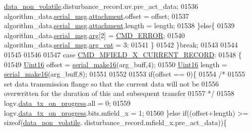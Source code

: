 \begin{DoxyCode}
{{{{{      \hyperlink{a00060_a76ac5f917f5308dcd83de0d7c94559fb}{data\_non\_volatile}.disturbance\_record.uv.pre\_act\_data;
01536                        algorithm\_data.\hyperlink{a00016_afcf5f557aea688aad985eec15269c1da}{serial\_msg}.\hyperlink{a00031_a040f6d5d58d18d8aeaf447eda7f50172}{attachment}.offset      = offset;
01537                        algorithm\_data.\hyperlink{a00016_afcf5f557aea688aad985eec15269c1da}{serial\_msg}.\hyperlink{a00031_a040f6d5d58d18d8aeaf447eda7f50172}{attachment}.length      = length;
01538                      \}\textcolor{keywordflow}{else}\{
01539                          algorithm\_data.\hyperlink{a00016_afcf5f557aea688aad985eec15269c1da}{serial\_msg}.\hyperlink{a00031_af7d6f762438c80072bd9dc0e4dd4ae1e}{arg}[2]               = 
      \hyperlink{a00021_a1764a522e9c1a59a59be8757c69fa494}{CMD\_ERROR};
01540                          algorithm\_data.\hyperlink{a00016_afcf5f557aea688aad985eec15269c1da}{serial\_msg}.\hyperlink{a00031_a7b79f40e2eeec288091afd340bf8f591}{arg\_cnt}              = 3;
01541                      \}
01542                 \}\textcolor{keywordflow}{break};
01543 
01544 
01545 
01546 
01547                  \textcolor{keywordflow}{case}  \hyperlink{a00021_ab796345ffdbc6a240b67b56583bb77c6}{CMD\_MFIELD\_X\_CURRENT\_RECORD}:
01548                 \{
01549                     \hyperlink{a00072_a59a9f6be4562c327cbfb4f7e8e18f08b}{Uint16} offset = \hyperlink{a00031_abc17de32f14103a5be219df0d4ad9176}{serial\_make16}(arg\_buff,4);
01550                     \hyperlink{a00072_a59a9f6be4562c327cbfb4f7e8e18f08b}{Uint16} length = \hyperlink{a00031_abc17de32f14103a5be219df0d4ad9176}{serial\_make16}(arg\_buff,8);
01551 
01552 
01553                     \textcolor{keywordflow}{if}(offset == 0)\{
01554                         \textcolor{comment}{/*}
01555 \textcolor{comment}{                         set data transmission flange so that the current data will not be}
01556 \textcolor{comment}{                         overwritten for the duration of this and subsequent transfer}
01557 \textcolor{comment}{                       */}
01558                         logv.\hyperlink{a00021_a6cdefde69642ef511e3252c38be68516}{data\_tx\_on\_progress}.all             = 0;
01559                         logv.\hyperlink{a00021_a6cdefde69642ef511e3252c38be68516}{data\_tx\_on\_progress}.bits.mfield\_x   = 1;
01560                     \}\textcolor{keywordflow}{else} \textcolor{keywordflow}{if}((offset+length) >= \textcolor{keyword}{sizeof}(\hyperlink{a00060_a76ac5f917f5308dcd83de0d7c94559fb}{data\_non\_volatile}.
      disturbance\_record.mfield\_x.pre\_act\_data))\{
}}}}}
\end{DoxyCode}
